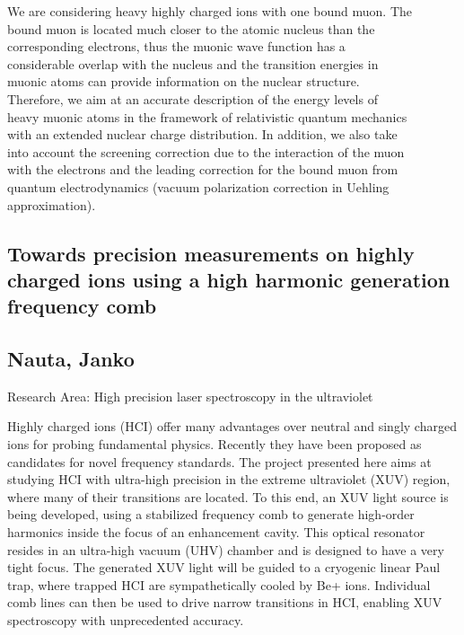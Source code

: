 \noindent We are considering heavy highly charged ions with one bound muon. The\\bound muon is located much closer to the atomic nucleus than the\\corresponding electrons, thus the muonic wave function has a\\considerable overlap with the nucleus and the transition energies in\\muonic atoms can provide information on the nuclear structure.\\Therefore, we aim at an accurate description of the energy levels of\\heavy muonic atoms in the framework of relativistic quantum mechanics\\with an extended nuclear charge distribution. In addition, we also take\\into account the screening correction due to the interaction of the muon\\with the electrons and the leading correction for the bound muon from\\quantum electrodynamics (vacuum polarization correction in Uehling\\approximation).
\newpage
\subsection*{\centering \large Towards precision measurements on highly charged ions using a high harmonic generation frequency comb}
\subsection*{\centering \normalsize Nauta, Janko}
Research Area: High precision laser spectroscopy in the ultraviolet\newline

\noindent Highly charged ions (HCI) offer many advantages over neutral and singly charged ions for probing fundamental physics. Recently they have been proposed as candidates for novel frequency standards. The project presented here aims at studying HCI with ultra-high precision in the extreme ultraviolet (XUV) region, where many of their transitions are located. To this end, an XUV light source is being developed, using a stabilized frequency comb to generate high-order harmonics inside the focus of an enhancement cavity. This optical resonator resides in an ultra-high vacuum (UHV) chamber and is designed to have a very tight focus. The generated XUV light will be guided to a cryogenic linear Paul trap, where trapped HCI are sympathetically cooled by Be+ ions. Individual comb lines can then be used to drive narrow transitions in HCI, enabling XUV spectroscopy with unprecedented accuracy.

